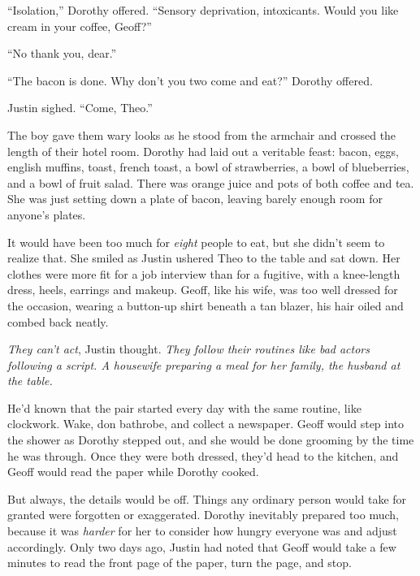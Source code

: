 ``Isolation,'' Dorothy offered.  ``Sensory deprivation, intoxicants.  Would you like cream in your coffee, Geoff?''



``No thank you, dear.''



``The bacon is done.  Why don't you two come and eat?''  Dorothy offered.



Justin sighed. ``Come, Theo.''



The boy gave them wary looks as he stood from the armchair and crossed the length of their hotel room.  Dorothy had laid out a veritable feast: bacon, eggs, english muffins, toast, french toast, a bowl of strawberries, a bowl of blueberries, and a bowl of fruit salad.  There was orange juice and pots of both coffee and tea.  She was just setting down a plate of bacon, leaving barely enough room for anyone's plates.



It would have been too much for \emph{eight} people to eat, but she didn't seem to realize that.  She smiled as Justin ushered Theo to the table and sat down.  Her clothes were more fit for a job interview than for a fugitive, with a knee-length dress, heels, earrings and makeup.  Geoff, like his wife, was too well dressed for the occasion, wearing a button-up shirt beneath a tan blazer, his hair oiled and combed back neatly.



\emph{They can't act}, Justin thought.  \emph{They follow their routines like bad actors following a script.  A housewife preparing a meal for her family, the husband at the table.}



He'd known that the pair started every day with the same routine, like clockwork.  Wake, don bathrobe, and collect a newspaper.  Geoff would step into the shower as Dorothy stepped out, and she would be done grooming by the time he was through.  Once they were both dressed, they'd head to the kitchen, and Geoff would read the paper while Dorothy cooked.



But always, the details would be off.  Things any ordinary person would take for granted were forgotten or exaggerated.  Dorothy inevitably prepared too much, because it was \emph{harder} for her to consider how hungry everyone was and adjust accordingly.  Only two days ago, Justin had noted that Geoff would take a few minutes to read the front page of the paper, turn the page, and stop.



